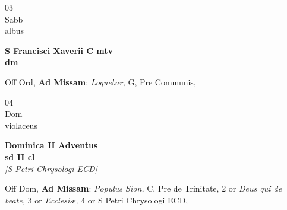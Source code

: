 \documentclass[10pt, openany]{book}
\begin{document}
        \begin{center}
            \begin{minipage}{3.5in}
                \vspace{2em}
                \begin{minipage}{0.5in}
                    {\Huge 03} \\
                    {\normalsize Sabb} \\
                    {\normalsize albus}
                \end{minipage}
                \begin{minipage}{3.0in}
                    \textbf{ \large S Francisci Xaverii C mtv \\
                    \textnormal{\normalsize dm}} \\ 
                \end{minipage}
                \begin{justify}Off Ord, \textbf{Ad Missam}: \textit{Loquebar,} G, Pre Communis,  
                \end{justify}
            \end{minipage}
        \end{center}
    
        \begin{center}
            \begin{minipage}{3.5in}
                \vspace{2em}
                \begin{minipage}{0.5in}
                    {\Huge 04} \\
                    {\normalsize Dom} \\
                    {\normalsize violaceus}
                \end{minipage}
                \begin{minipage}{3.0in}
                    \textbf{ \large Dominica II Adventus \\
                    \textnormal{\normalsize sd II cl}} \\ \textit{[S Petri Chrysologi ECD]} \\ 
                \end{minipage}
                \begin{justify}Off Dom, \textbf{Ad Missam}: \textit{Populus Sion,} C, Pre de Trinitate, 2 or \textit{Deus qui de beate,} 3 or \textit{Ecclesiæ,} 4 or S Petri Chrysologi ECD,  
                \end{justify}
            \end{minipage}
        \end{center}
    
\end{document}
